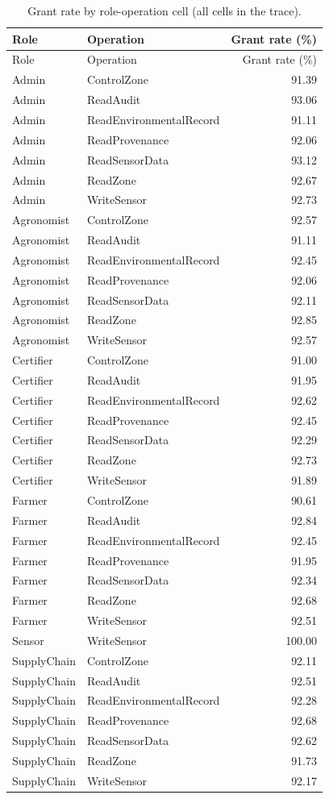 \begin{longtable}{llr}
\caption{Grant rate by role-operation cell (all cells in the trace).}\label{tab:s5}\\
\toprule
Role & Operation & Grant rate (\%) \\
\midrule
\endfirsthead
\toprule
Role & Operation & Grant rate (\%) \\
\midrule
\endhead
\bottomrule
\endfoot
Admin & ControlZone & 91.39 \\
Admin & ReadAudit & 93.06 \\
Admin & ReadEnvironmentalRecord & 91.11 \\
Admin & ReadProvenance & 92.06 \\
Admin & ReadSensorData & 93.12 \\
Admin & ReadZone & 92.67 \\
Admin & WriteSensor & 92.73 \\
Agronomist & ControlZone & 92.57 \\
Agronomist & ReadAudit & 91.11 \\
Agronomist & ReadEnvironmentalRecord & 92.45 \\
Agronomist & ReadProvenance & 92.06 \\
Agronomist & ReadSensorData & 92.11 \\
Agronomist & ReadZone & 92.85 \\
Agronomist & WriteSensor & 92.57 \\
Certifier & ControlZone & 91.00 \\
Certifier & ReadAudit & 91.95 \\
Certifier & ReadEnvironmentalRecord & 92.62 \\
Certifier & ReadProvenance & 92.45 \\
Certifier & ReadSensorData & 92.29 \\
Certifier & ReadZone & 92.73 \\
Certifier & WriteSensor & 91.89 \\
Farmer & ControlZone & 90.61 \\
Farmer & ReadAudit & 92.84 \\
Farmer & ReadEnvironmentalRecord & 92.45 \\
Farmer & ReadProvenance & 91.95 \\
Farmer & ReadSensorData & 92.34 \\
Farmer & ReadZone & 92.68 \\
Farmer & WriteSensor & 92.51 \\
Sensor & WriteSensor & 100.00 \\
SupplyChain & ControlZone & 92.11 \\
SupplyChain & ReadAudit & 92.51 \\
SupplyChain & ReadEnvironmentalRecord & 92.28 \\
SupplyChain & ReadProvenance & 92.68 \\
SupplyChain & ReadSensorData & 92.62 \\
SupplyChain & ReadZone & 91.73 \\
SupplyChain & WriteSensor & 92.17 \\
\end{longtable}